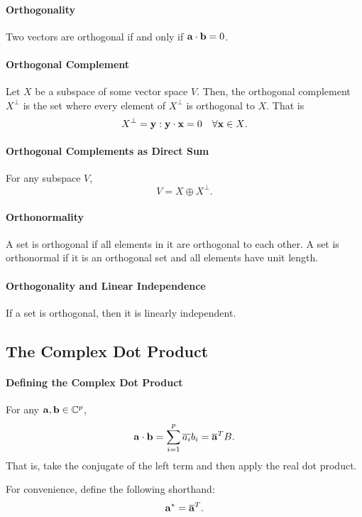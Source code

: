 \paragraph{Orthogonality}
Two vectors are orthogonal if and only if \( \mathbf{a} \cdot \mathbf{b} = 0 \).

\paragraph{Orthogonal Complement}
Let \( X \) be a subspace of some vector space \( V \).
Then, the orthogonal complement \( X^\perp \) is the set where
every element of \( X^\perp \) is orthogonal to \( X \).
That is \[
    X^\perp = {\mathbf{y} : \mathbf{y} \cdot \mathbf{x} = 0 \quad \forall \mathbf{x} \in X}.
\]

\paragraph{Orthogonal Complements as Direct Sum}
For any subspace \( V \), \[
    V = X \oplus X^\perp.
\]

\paragraph{Orthonormality}
A set is orthogonal if all elements in it are orthogonal to each other.
A set is orthonormal if it is an orthogonal set and all elements have
unit length.

\paragraph{Orthogonality and Linear Independence}
If a set is orthogonal, then it is linearly independent.

% 
% 
%
\subsection{The Complex Dot Product}

\paragraph{Defining the Complex Dot Product}
For any \( \mathbf{a}, \mathbf{b} \in \mathbb{C}^p \), \[
    \mathbf{a} \cdot \mathbf{b} = \sum_{i=1}^p \overline{a_i} b_i = \overline{\mathbf{a}}^{T}B.
\]
That is, take the conjugate of the left term and then apply the real dot
product.

For convenience, define the following shorthand: \[
    \mathbf{a}^* = \overline{\mathbf{a}}^T.
\]

